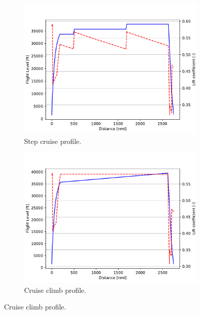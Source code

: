 \begin{figure}[!h]
	\begin{subfigure}{0.45\textwidth}
		\centering
		\includegraphics[keepaspectratio, width=\linewidth]{images/chap2/FAST_base_cruise_step_profile}
		\caption{Step cruise profile.}
		\label{fig:fast_base_cruise_step}
	\end{subfigure}	
	\hspace{10mm}
	\begin{subfigure}{0.45\textwidth}
		\centering
		\includegraphics[keepaspectratio, width=\linewidth]{images/chap2/FAST_base_cruise_climb_profile}
		\caption{Cruise climb profile.}
		\label{fig:fast_base_cruise_climb}
	\end{subfigure}
	

\end{figure}
